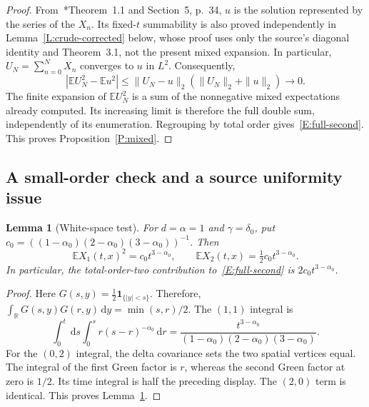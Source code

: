 \documentclass[12pt]{article}
\numberwithin{equation}{section}
\newtheorem{lemma}[theorem]{Lemma}
\theoremstyle{definition}
\newcommand{\R}{\mathbb{R}}
\newcommand{\E}{\mathbb{E}}
\newcommand{\ud}{\,\mathrm{d}}
\begin{document}
\begin{proof}
  From~\cite{chen:author2026:time-dependency}*{Theorem~1.1 and Section~5,
  p.~34}, $u$ is the solution represented by the series of the $X_n$.
  Its fixed-$t$ summability is also proved independently in
  Lemma~\ref{L:crude-corrected} below, whose proof uses only the source's
  diagonal identity and Theorem~3.1, not the present mixed expansion.
  In particular, $U_N=\sum_{n=0}^N X_n$ converges to $u$ in $L^2$.
  Consequently,
  \[
    |\E U_N^2-\E u^2|
    \le\|U_N-u\|_2(\|U_N\|_2+\|u\|_2)\longrightarrow0.
  \]
  The finite expansion of $\E U_N^2$ is a sum of the nonnegative mixed
  expectations already computed. Its increasing limit is therefore the
  full double sum, independently of its enumeration. Regrouping by total
  order gives~\eqref{E:full-second}. This proves Proposition~\ref{P:mixed}.
\end{proof}

\subsection{A small-order check and a source uniformity issue}

\begin{lemma}[White-space test]\label{L:white-test}
  For $d=\alpha=1$ and $\gamma=\delta_0$, put
  $c_0=((1-\alpha_0)(2-\alpha_0)(3-\alpha_0))^{-1}$. Then
  \begin{equation}\label{E:white-test}
    \E X_1(t,x)^2=c_0t^{3-\alpha_0},\qquad
    \E X_2(t,x)=\tfrac12c_0t^{3-\alpha_0}.
  \end{equation}
  In particular, the total-order-two contribution to~\eqref{E:full-second}
  is $2c_0t^{3-\alpha_0}$.
\end{lemma}

\begin{proof}
  Here $G(s,y)=\frac12\mathbf1_{\{|y|<s\}}$. Therefore,
  $\int_\R G(s,y)G(r,y)\ud y=\min(s,r)/2$. The $(1,1)$ integral is
  \[
    \int_0^t\ud s\int_0^s r(s-r)^{-\alpha_0}\ud r
    =\frac{t^{3-\alpha_0}}
    {(1-\alpha_0)(2-\alpha_0)(3-\alpha_0)}.
  \]
  For the $(0,2)$ integral, the delta covariance sets the two spatial
  vertices equal. The integral of the first Green factor is $r$, whereas
  the second Green factor at zero is $1/2$. Its time integral is half the
  preceding display. The $(2,0)$ term is identical. This proves
  Lemma~\ref{L:white-test}.
\end{proof}
\end{document}
